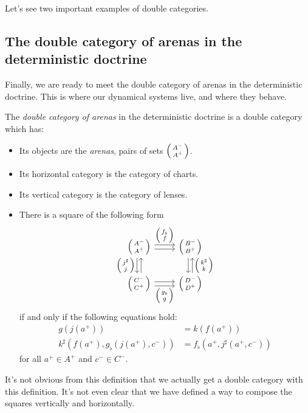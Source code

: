 \documentclass[DynamicalBook]{subfiles}
\begin{document}
Let's see two important examples of double categories.

\subsection{The double category of arenas in the deterministic doctrine}

Finally, we are ready to meet the double category of arenas in the deterministic
doctrine. This is where our dynamical
systems live, and where they behave.

\begin{definition}\label{def.double_category_of_arenas_discrete}
  The \emph{double category of arenas} in the deterministic doctrine is a double
  category which has:
  \begin{itemize}
  \item Its objects are the \emph{arenas}, pairs of sets $\lens{A^-}{A^+}$.
  \item Its horizontal category is the category of charts.
  \item Its vertical category is the category of lenses.
  \item There is a square of the following form
    \begin{equation}\label{eqn.dbl_cat_arena_square}
      \begin{tikzcd}
        \lens{A^-}{A^+} \ar[r, shift left, "\lens{f_{\flat}}{f}"] \ar[r, shift
        right] \ar[d, shift right, "\lens{j^{\sharp}}{j}"'] \ar[d, shift left,
        leftarrow] & \lens{B^-}{B^+} \ar[d, shift left, leftarrow,
        "\lens{k^{\sharp}}{k}"] \ar[d, shift right]\\
        \lens{C^-}{C^+} \ar[r, shift right, "\lens{g_{\flat}}{g}"'] \ar[r,
        shift left] & \lens{D^-}{D^+}
      \end{tikzcd}
    \end{equation}
    if and only if the following equations hold:
    \begin{align}\label{eqn.dbl_cat_arena_square_commuting}
      g(j(a^+)) &= k(f(a^+)) \\
      k^{\sharp}(f(a^+), g_{\flat}(j(a^+), c^-)) &= f_{\flat}(a^+, j^{\sharp}(a^+, c^-)) 
    \end{align}
    for all $a^+ \in A^+$ and $c^- \in C^-$.
  \end{itemize}
\end{definition}

It's not obvious from this definition that we actually get a double category
with this definition. It's not even clear that we have defined a way to compose
the squares vertically and horizontally.
\end{document}
